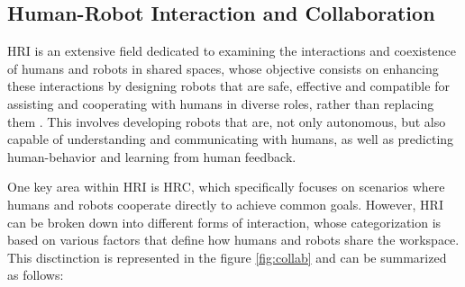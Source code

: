

\subsection{Human-Robot Interaction and Collaboration}
\label{subsection:human-robot-collab}
% 

\ac{HRI} is an extensive field dedicated to examining the interactions and coexistence of humans and robots in shared spaces, whose objective consists
on enhancing these interactions by designing robots that are safe, effective and compatible for assisting and cooperating with humans in diverse roles, 
rather than replacing them \cite{Ogenyi2021}.
This involves developing robots that are, not only autonomous, but also capable of understanding and communicating with humans, as well as predicting
human-behavior and learning from human feedback. 


One key area within \ac{HRI} is \ac{HRC}, which specifically focuses on scenarios where humans and robots cooperate directly to achieve common goals.
However, \ac{HRI} can be broken down into different forms of interaction, whose categorization is based on various factors that define how 
humans and robots share the workspace. This disctinction is represented in the figure \ref{fig:collab} \cite{Jahanmahin2022} and can be summarized as follows:

